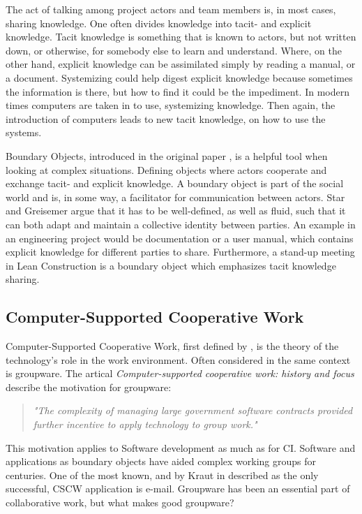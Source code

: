 The act of talking among project actors and team members is, in most cases, sharing knowledge. One often divides knowledge into tacit- and explicit knowledge. Tacit knowledge is something that is known to actors, but not written down, or otherwise, for somebody else to learn and understand. Where, on the other hand, explicit knowledge can be assimilated simply by reading a manual, or a document. Systemizing could help digest explicit knowledge because sometimes the information is there, but how to find it could be the impediment. In modern times computers are taken in to use, systemizing knowledge. Then again, the introduction of computers leads to new tacit knowledge, on how to use the systems.

Boundary Objects, introduced in the original paper \cite{star&griesemer}, is a helpful tool when looking at complex situations. Defining objects where actors cooperate and exchange tacit- and explicit knowledge. A boundary object is part of the social world and is, in some way, a facilitator for communication between actors. Star and Greisemer argue that it has to be well-defined, as well as fluid, such that it can both adapt and maintain a collective identity between parties. An example in an engineering project would be documentation or a user manual, which contains explicit knowledge for different parties to share. Furthermore, a stand-up meeting in Lean Construction is a boundary object which emphasizes tacit knowledge sharing.

\subsection{Computer-Supported Cooperative Work}
Computer-Supported Cooperative Work, first defined by \cite{Friedman}, is the theory of the technology's role in the work environment. Often considered in the same context is groupware. The artical \textit{Computer-supported cooperative work: history and focus} \cite{Grudin} describe the motivation for groupware: 
\begin{quotation}
    \noindent \textit{"The complexity of managing large government software contracts provided further incentive to apply technology to group work."}
\end{quotation}
This motivation applies to Software development as much as for CI. Software and applications as boundary objects have aided complex working groups for centuries. One of the most known, and by Kraut in \cite{Kraut} described as the only successful, CSCW application is e-mail. Groupware has been an essential part of collaborative work, but what makes good groupware? 

